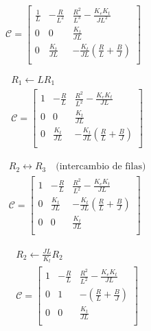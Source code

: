 \begin{equation*}
  \mathcal{C} = 
  \begin{bmatrix}
      \frac{1}{L} &  -\frac{R}{L^2}   &  \frac{R^2}{L^3}-\frac{K_e K_t}{JL^2}  \\
      0           &   0               &  \frac{K_t}{JL}                        \\
      0           &   \frac{K_t}{JL}  &  -\frac{K_t}{JL}\left(\frac{R}{L}+\frac{B}{J}\right) \\
  \end{bmatrix}
\end{equation*}

\begin{equation*}
  \begin{aligned}
    &R_1\leftarrow L R_1\\
    &\mathcal{C} = 
    \begin{bmatrix}
      1           &  -\frac{R}{L}     &  \frac{R^2}{L^2}-\frac{K_e K_t}{JL}    \\
      0           &   0               &  \frac{K_t}{JL}                        \\
      0           &   \frac{K_t}{JL}  &  -\frac{K_t}{JL}\left(\frac{R}{L}+\frac{B}{J}\right) \\
    \end{bmatrix}
  \end{aligned}
\end{equation*}

\begin{equation*}
  \begin{aligned}
    &R_2 \leftrightarrow R_3 \quad \text{(intercambio de filas)}\\
    &\mathcal{C} = 
    \begin{bmatrix}
      1           &  -\frac{R}{L}     &  \frac{R^2}{L^2}-\frac{K_e K_t}{JL}    \\
      0           &   \frac{K_t}{JL}  &  -\frac{K_t}{JL}\left(\frac{R}{L}+\frac{B}{J}\right) \\
      0           &   0               &  \frac{K_t}{JL}                        \\
    \end{bmatrix}
  \end{aligned}
\end{equation*}

\begin{equation*}
  \begin{aligned}
    &R_2 \leftarrow \tfrac{JL}{K_t} R_2\\
    &\mathcal{C} = 
    \begin{bmatrix}
      1           &  -\frac{R}{L}     &  \frac{R^2}{L^2}-\frac{K_e K_t}{JL}    \\
      0           &   1               &  -\left(\frac{R}{L}+\frac{B}{J}\right) \\
      0           &   0               &  \frac{K_t}{JL}                        \\
    \end{bmatrix}
  \end{aligned}
\end{equation*}

